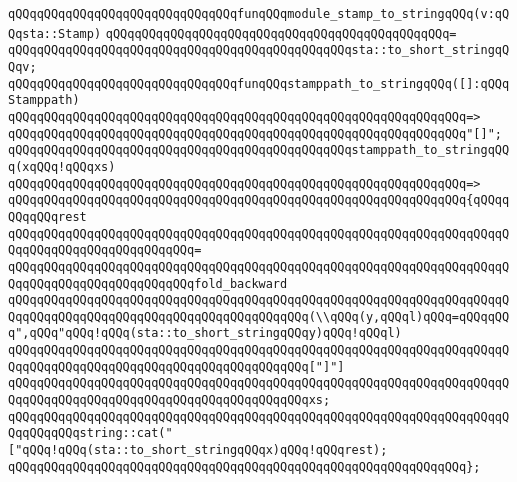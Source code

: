 \newline
\verb|qQQqqQQqqQQqqQQqqQQqqQQqqQQqqQQqfunqQQqmodule_stamp_to_stringqQQq(v:qQQqsta::Stamp)|\newline
\verb|qQQqqQQqqQQqqQQqqQQqqQQqqQQqqQQqqQQqqQQqqQQqqQQq=|\newline
\verb|qQQqqQQqqQQqqQQqqQQqqQQqqQQqqQQqqQQqqQQqqQQqqQQqsta::to_short_stringqQQqv;|\newline
\newline
\newline
\verb|qQQqqQQqqQQqqQQqqQQqqQQqqQQqqQQqfunqQQqstamppath_to_stringqQQq([]:qQQqStamppath)|\newline
\verb|qQQqqQQqqQQqqQQqqQQqqQQqqQQqqQQqqQQqqQQqqQQqqQQqqQQqqQQqqQQqqQQq=>|\newline
\verb|qQQqqQQqqQQqqQQqqQQqqQQqqQQqqQQqqQQqqQQqqQQqqQQqqQQqqQQqqQQqqQQq"[]";|\newline
\newline
\verb|qQQqqQQqqQQqqQQqqQQqqQQqqQQqqQQqqQQqqQQqqQQqqQQqstamppath_to_stringqQQq(xqQQq!qQQqxs)|\newline
\verb|qQQqqQQqqQQqqQQqqQQqqQQqqQQqqQQqqQQqqQQqqQQqqQQqqQQqqQQqqQQqqQQq=>|\newline
\verb|qQQqqQQqqQQqqQQqqQQqqQQqqQQqqQQqqQQqqQQqqQQqqQQqqQQqqQQqqQQqqQQq{qQQqqQQqqQQqrest|\newline
\verb|qQQqqQQqqQQqqQQqqQQqqQQqqQQqqQQqqQQqqQQqqQQqqQQqqQQqqQQqqQQqqQQqqQQqqQQqqQQqqQQqqQQqqQQqqQQqqQQq=|\newline
\verb|qQQqqQQqqQQqqQQqqQQqqQQqqQQqqQQqqQQqqQQqqQQqqQQqqQQqqQQqqQQqqQQqqQQqqQQqqQQqqQQqqQQqqQQqqQQqqQQqfold_backward|\newline
\verb|qQQqqQQqqQQqqQQqqQQqqQQqqQQqqQQqqQQqqQQqqQQqqQQqqQQqqQQqqQQqqQQqqQQqqQQqqQQqqQQqqQQqqQQqqQQqqQQqqQQqqQQqqQQqqQQq(\\qQQq(y,qQQql)qQQq=qQQqqQQq",qQQq"qQQq!qQQq(sta::to_short_stringqQQqy)qQQq!qQQql)|\newline
\verb|qQQqqQQqqQQqqQQqqQQqqQQqqQQqqQQqqQQqqQQqqQQqqQQqqQQqqQQqqQQqqQQqqQQqqQQqqQQqqQQqqQQqqQQqqQQqqQQqqQQqqQQqqQQqqQQq["]"]|\newline
\verb|qQQqqQQqqQQqqQQqqQQqqQQqqQQqqQQqqQQqqQQqqQQqqQQqqQQqqQQqqQQqqQQqqQQqqQQqqQQqqQQqqQQqqQQqqQQqqQQqqQQqqQQqqQQqqQQqxs;|\newline
\newline
\verb|qQQqqQQqqQQqqQQqqQQqqQQqqQQqqQQqqQQqqQQqqQQqqQQqqQQqqQQqqQQqqQQqqQQqqQQqqQQqqQQqstring::cat("["qQQq!qQQq(sta::to_short_stringqQQqx)qQQq!qQQqrest);|\newline
\verb|qQQqqQQqqQQqqQQqqQQqqQQqqQQqqQQqqQQqqQQqqQQqqQQqqQQqqQQqqQQqqQQq};|\newline
